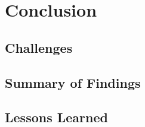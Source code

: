 \chapter{Conclusion}\label{chap:conclusion}
    \section{Challenges}\label{sec:challenges}
    \section{Summary of Findings}\label{sec:findings-summary}
    \section{Lessons Learned}\label{sec:lessons-learned}
